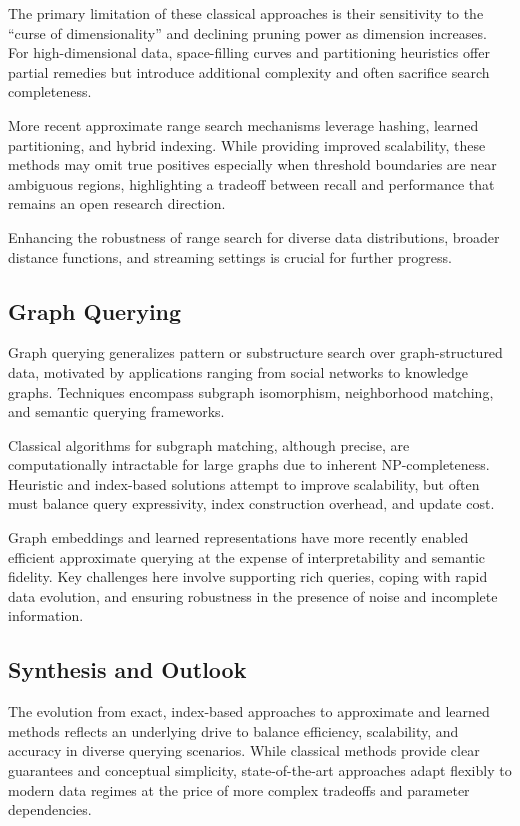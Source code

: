 \documentclass[sigconf]{acmart}
\begin{document}
The primary limitation of these classical approaches is their sensitivity to the ``curse of dimensionality'' and declining pruning power as dimension increases. For high-dimensional data, space-filling curves and partitioning heuristics offer partial remedies but introduce additional complexity and often sacrifice search completeness.

More recent approximate range search mechanisms leverage hashing, learned partitioning, and hybrid indexing. While providing improved scalability, these methods may omit true positives especially when threshold boundaries are near ambiguous regions, highlighting a tradeoff between recall and performance that remains an open research direction.

Enhancing the robustness of range search for diverse data distributions, broader distance functions, and streaming settings is crucial for further progress.

\subsection{Graph Querying}
Graph querying generalizes pattern or substructure search over graph-structured data, motivated by applications ranging from social networks to knowledge graphs. Techniques encompass subgraph isomorphism, neighborhood matching, and semantic querying frameworks.

Classical algorithms for subgraph matching, although precise, are computationally intractable for large graphs due to inherent NP-completeness. Heuristic and index-based solutions attempt to improve scalability, but often must balance query expressivity, index construction overhead, and update cost.

Graph embeddings and learned representations have more recently enabled efficient approximate querying at the expense of interpretability and semantic fidelity. Key challenges here involve supporting rich queries, coping with rapid data evolution, and ensuring robustness in the presence of noise and incomplete information.

\subsection{Synthesis and Outlook}
The evolution from exact, index-based approaches to approximate and learned methods reflects an underlying drive to balance efficiency, scalability, and accuracy in diverse querying scenarios. While classical methods provide clear guarantees and conceptual simplicity, state-of-the-art approaches adapt flexibly to modern data regimes at the price of more complex tradeoffs and parameter dependencies.
\end{document}
